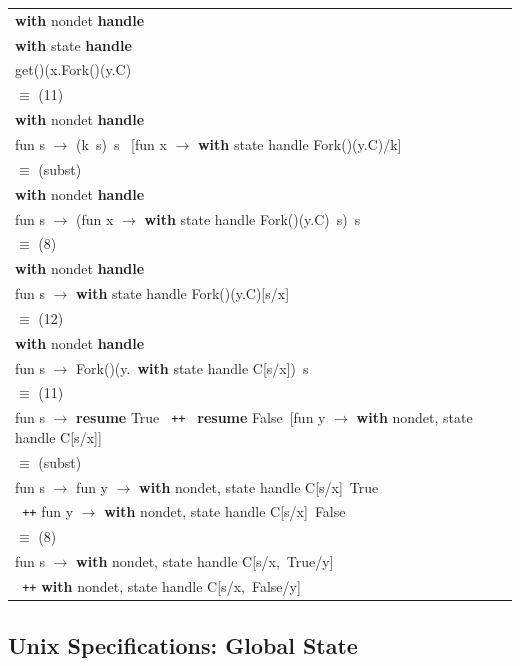 \documentclass[logo,bsc,singlespacing,parskip]{infthesis}
\begin{document}
\begin{longtable}{@{}l@{}}
\textbf{with} nondet \textbf{handle} \\ \quad
\textbf{with} state \textbf{handle} \\
\quad\quad get()(x.Fork()(y.C) \\
\quad$\equiv$ (11) \\
\textbf{with} nondet \textbf{handle} \\ \quad
fun s $\rightarrow$ (k\ s)\ s \ [fun x $\rightarrow$ \textbf{with } state handle Fork()(y.C)/k] \\
\quad$\equiv$ (subst) \\
\textbf{with} nondet \textbf{handle} \\ \quad

fun s $\rightarrow$ (fun x $\rightarrow$ \textbf{with } state handle Fork()(y.C)\ s)\ s \\
\quad$\equiv$ (8) \\
\textbf{with} nondet \textbf{handle} \\ \quad
fun s $\rightarrow$ \textbf{with } state handle Fork()(y.C)[s/x] \\
\quad$\equiv$ (12) \\
\textbf{with} nondet \textbf{handle} \\ \quad

fun s $\rightarrow$ Fork()(y.\ \textbf{with } state handle C[s/x])\ s \\
\quad$\equiv$ (11) \\
fun s $\rightarrow$ \textbf{resume } True \texttt{ ++ } \textbf{resume } False\ [fun y $\rightarrow$ \textbf{with } nondet, state handle C[s/x]] \\
\quad$\equiv$ (subst) \\
fun s $\rightarrow$ 
\quad\quad fun y $\rightarrow$ \textbf{with } nondet, state handle C[s/x]\ True \\
\quad\quad\quad\quad\quad\texttt{ ++} 
 fun y $\rightarrow$ \textbf{with } nondet, state handle C[s/x]\ False \\
\quad$\equiv$ (8) \\
fun s $\rightarrow$ \quad \textbf{with } nondet, state handle C[s/x,\ True/y] \\
\quad\quad\quad\quad \texttt{ ++} 
 \textbf{with } nondet, state handle C[s/x,\ False/y] \\
\end{longtable}






\subsection{Unix Specifications: Global State }
\end{document}
